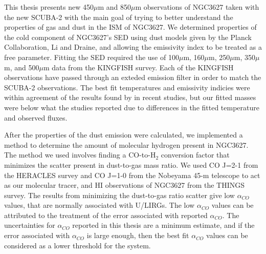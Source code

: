 This thesis presents new 450$\mu$m and 850$\mu$m observations of NGC3627 taken with the new SCUBA-2 with the main goal of trying to better understand the properties of gas and dust in the ISM of NGC3627.  We determined properties of the cold component of NGC3627's SED using dust models given by the Planck Collaboration, Li and Draine, and allowing the emissivity index to be treated as a free parameter.  Fitting the SED required the use of 100$\mu$m, 160$\mu$m, 250$\mu$m, 350$\mu$m, and 500$\mu$m data from the KINGFISH survey.  Each of the KINGFISH observations have passed through an exteded emission filter in order to match the SCUBA-2 observations.  The best fit temperatures and emissivity indicies were within agreement of the results found by in recent studies, but our fitted masses were below what the studies reported due to differences in the fitted temperature and observed fluxes.

After the properties of the dust emission were calculated, we implemented a method to determine the amount of molecular hydrogen present in NGC3627.  The method we used involves finding a CO-to-H$_2$ conversion factor that minimizes the scatter present in dust-to-gas mass ratio. We used CO J=2-1 from the HERACLES survey and CO J=1-0 from the Nobeyama 45-m telescope to act as our molecular tracer, and HI observations of NGC3627 from the THINGS survey.  The results from minimizing the dust-to-gas ratio scatter give low $\alpha_{CO}$ values, that are normally associated with U/LIRGs.  The low $\alpha_{CO}$ values can be attributed to the treatment of the error associated with reported $\alpha_{CO}$.  The uncertainties for $\alpha_{CO}$ reported in this thesis are a minimum estimate, and if the error associated with $\alpha_{CO}$ is large enough, then the best fit $\alpha_{CO}$ values can be considered as a lower threshold for the system.
